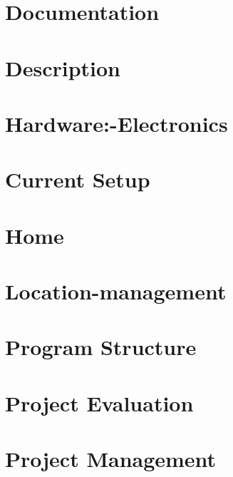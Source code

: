 \documentclass[twoside]{book}
\newcommand{\+}{\discretionary{\mbox{\scriptsize$\hookleftarrow$}}{}{}}
\begin{document}
\chapter{Documentation}
\label{md_doc_wiki__documentation}

\chapter{Description}
\label{md_doc_wiki__hardware}

\chapter{Hardware\+:-\/\+Electronics}
\label{md_doc_wiki__hardware_1-_electronics}

\chapter{Current Setup}
\label{md_doc_wiki__hardware_1-_mechanical}

\chapter{Home}
\label{md_doc_wiki__home}

\chapter{Location-\/management}
\label{md_doc_wiki__location-management}

\chapter{Program Structure}
\label{md_doc_wiki__program-_structure}

\chapter{Project Evaluation}
\label{md_doc_wiki__project-_evaluation}

\chapter{Project Management}
\label{md_doc_wiki__project-_management}

\end{document}
